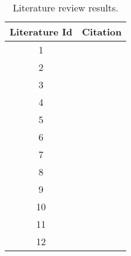\begin{table}[ht!]
    \begin{tabular}{|c c |} 
        \hline
        Literature Id
        & Citation
        \\ 
        \hline\hline
        1
        & \cite{Dafni}
        \\ 
        \hline
        2
        & \cite{Tilkov}
        \\ 
        \hline
        3
        & \cite{Chitra}
        \\ 
        \hline
        4
        & \cite{Shkodra}
        \\ 
        \hline
        5
        & \cite{Chaniotis}
        \\ 
        \hline
        6
        & \cite{NkenyereyeLionel2016PEoN}
        \\ 
        \hline
        7
        & \cite{faustino}
        \\ 
        \hline
        8
        & \cite{Challapalli}
        \\ 
        \hline
        9
        & \cite{Kyriakou}
        \\ 
        \hline
        10
        & \cite{Kyriakou}
        \\ 
        \hline
        11
        & \cite{Lei}
        \\ 
        \hline
        12
        & \cite{SelakovicPerformanceIssues}
        \\ 
        \hline
    \end{tabular}    
    \caption{Literature review results.}
    \label{table:literature:results}
\end{table}


